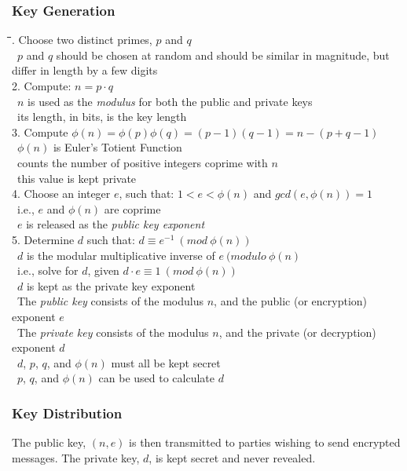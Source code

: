 \documentclass[10pt,letterpaper]{scrartcl}
\newcommand{\tbul}{\textbullet}
\newcommand{\tend}{\>\textendash}
\newcommand{\tasc}{\>\>\textasteriskcentered}
\newcommand{\tabDef}{\hspace{2em}\=\hspace{2em}\=\hspace{2em}\=\hspace{2em}\=\kill}
\begin{document}
\subsubsection{Key Generation}
\begin{tabbing}\tabDef 
1. Choose two distinct primes, $p$ and $q$ \\
	\tend\ $p$ and $q$ should be chosen at random and should be similar in magnitude, but differ in length by a few digits \\
2. Compute: $\displaystyle n=p\cdot q$ \\
	\tend\ $n$ is used as the \textit{modulus} for both the public and private keys \\
	\tend\ its length, in bits, is the key length\\
3. Compute $\displaystyle \phi (n) = \phi (p)\phi (q) = (p-1)(q-1)=n -(p+q-1)$ \\
	\tend\ $\displaystyle \phi (n)$ is Euler's Totient Function \\
		\tasc\ counts the number of positive integers coprime with $n$\\
	\tend\ this value is kept private \\
4. Choose an integer $e$, such that: $1 < e < \phi (n)$ and $gcd(e, \phi (n))=1$\\
	\tend\ i.e., $e$ and $\phi (n)$ are coprime \\
    \tend\ $e$ is released as the \textit{public key exponent} \\
5. Determine $d$ such that: $\displaystyle d \equiv e^{-1} \ (mod \ \phi (n))$\\
	\tend\ $d$ is the modular multiplicative inverse of $e \ (modulo \ \phi (n)$\\
    \tend\ i.e., solve for $d$, given $d\cdot e \equiv 1 \ (mod \ \phi (n))$\\
    \tend\ $d$ is kept as the private key exponent \\
\tbul\ The \textit{public key} consists of the modulus $n$, and the public (or encryption) exponent $e$ \\
\tbul\ The \textit{private key} consists of the modulus $n$, and the private (or decryption) exponent $d$ \\
\tbul\ $d$, $p$, $q$, and $\phi (n)$ must all be kept secret \\
	\tend\ $p$, $q$, and $\phi (n)$ can be used to calculate $d$
\end{tabbing}
\subsubsection{Key Distribution}
The public key, $(n, e)$ is then transmitted to parties wishing to send encrypted messages. The private key, $d$, is kept secret and never revealed.
\end{document}
